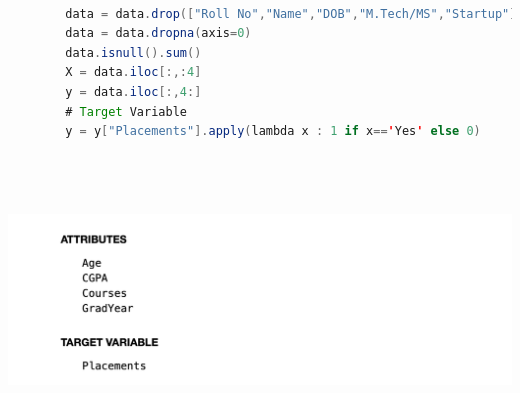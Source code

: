 \documentclass{article}
\begin{document}
	\begin{lstlisting}[language=Java]
		
		data = data.drop(["Roll No","Name","DOB","M.Tech/MS","Startup"],axis=1)
		data = data.dropna(axis=0)
		data.isnull().sum()
		X = data.iloc[:,:4]
		y = data.iloc[:,4:]
		# Target Variable
		y = y["Placements"].apply(lambda x : 1 if x=='Yes' else 0)
		
		
		
	\end{lstlisting}
	\includegraphics[scale=0.6]{images/2.png}\\\\\\
	
	
\end{document}
